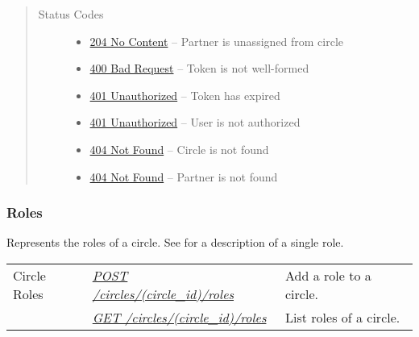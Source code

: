 \documentclass[letterpaper,10pt,english]{sphinxmanual}
\begin{document}
\begin{fulllineitems}
\begin{quote}
\begin{description}
\item[{Status Codes}] \leavevmode\begin{itemize}
\item {} 
\href{http://www.w3.org/Protocols/rfc2616/rfc2616-sec10.html\#sec10.2.5}{204 No Content} -- Partner is unassigned from circle

\item {} 
\href{http://www.w3.org/Protocols/rfc2616/rfc2616-sec10.html\#sec10.4.1}{400 Bad Request} -- Token is not well-formed

\item {} 
\href{http://www.w3.org/Protocols/rfc2616/rfc2616-sec10.html\#sec10.4.2}{401 Unauthorized} -- Token has expired

\item {} 
\href{http://www.w3.org/Protocols/rfc2616/rfc2616-sec10.html\#sec10.4.2}{401 Unauthorized} -- User is not authorized

\item {} 
\href{http://www.w3.org/Protocols/rfc2616/rfc2616-sec10.html\#sec10.4.5}{404 Not Found} -- Circle is not found

\item {} 
\href{http://www.w3.org/Protocols/rfc2616/rfc2616-sec10.html\#sec10.4.5}{404 Not Found} -- Partner is not found

\end{itemize}

\end{description}\end{quote}

\end{fulllineitems}



\subsubsection{Roles}
\label{\detokenize{resources/circle:roles}}
Represents the roles of a circle. See {\hyperref[\detokenize{resources/role:role}]{}} for a description of a single role.

\noindent\begin{tabulary}{\linewidth}{|L|L|L|}
\hline
{}\relax &\relax &\relax \\
\hline
Circle Roles
&
{\hyperref[\detokenize{resources/circle:post--circles-(circle_id)-roles}]{\emph{POST /circles/(circle\_id)/roles}}}
&
Add a role to a circle.
\\
\hline&
{\hyperref[\detokenize{resources/circle:get--circles-(circle_id)-roles}]{\emph{GET /circles/(circle\_id)/roles}}}
&
List roles of a circle.
\\
\hline\end{tabulary}
\end{document}
